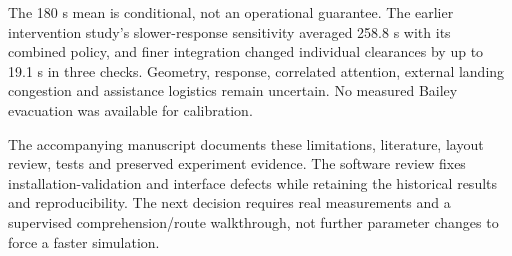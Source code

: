 The 180 s mean is conditional, not an operational guarantee. The earlier intervention study's slower-response sensitivity averaged 258.8 s with its combined policy, and finer integration changed individual clearances by up to 19.1 s in three checks. Geometry, response, correlated attention, external landing congestion and assistance logistics remain uncertain. No measured Bailey evacuation was available for calibration.

The accompanying manuscript documents these limitations, literature, layout review, tests and preserved experiment evidence. The software review fixes installation-validation and interface defects while retaining the historical results and reproducibility. The next decision requires real measurements and a supervised comprehension/route walkthrough, not further parameter changes to force a faster simulation.

